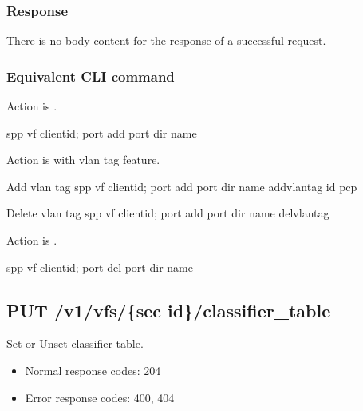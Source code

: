 \documentclass[a4paper,11pt,openany,oneside,english]{sphinxmanual}
\begin{document}
\subsubsection{Response}
\label{\detokenize{api_ref/spp_vf:id12}}
There is no body content for the response of a successful  request.


\subsubsection{Equivalent CLI command}
\label{\detokenize{api_ref/spp_vf:id13}}
Action is .

\begin{sphinxVerbatim}[commandchars=\\\{\},formatcom=\footnotesize]
spp \PYGZgt{} vf \PYGZob{}client\PYGZus{}id\PYGZcb{}; port add \PYGZob{}port\PYGZcb{} \PYGZob{}dir\PYGZcb{} \PYGZob{}name\PYGZcb{}
\end{sphinxVerbatim}

Action is  with vlan tag feature.

\begin{sphinxVerbatim}[commandchars=\\\{\},formatcom=\footnotesize]
\PYGZsh{} Add vlan tag
spp \PYGZgt{} vf \PYGZob{}client\PYGZus{}id\PYGZcb{}; port add \PYGZob{}port\PYGZcb{} \PYGZob{}dir\PYGZcb{} \PYGZob{}name\PYGZcb{} add\PYGZus{}vlantag \PYGZob{}id\PYGZcb{} \PYGZob{}pcp\PYGZcb{}

\PYGZsh{} Delete vlan tag
spp \PYGZgt{} vf \PYGZob{}client\PYGZus{}id\PYGZcb{}; port add \PYGZob{}port\PYGZcb{} \PYGZob{}dir\PYGZcb{} \PYGZob{}name\PYGZcb{} del\PYGZus{}vlantag
\end{sphinxVerbatim}

Action is .

\begin{sphinxVerbatim}[commandchars=\\\{\},formatcom=\footnotesize]
spp \PYGZgt{} vf \PYGZob{}client\PYGZus{}id\PYGZcb{}; port del \PYGZob{}port\PYGZcb{} \PYGZob{}dir\PYGZcb{} \PYGZob{}name\PYGZcb{}
\end{sphinxVerbatim}


\subsection{PUT /v1/vfs/\{sec id\}/classifier\_table}
\label{\detokenize{api_ref/spp_vf:put-v1-vfs-sec-id-classifier-table}}
Set or Unset classifier table.
\begin{itemize}
\item {} 
Normal response codes: 204

\item {} 
Error response codes: 400, 404

\end{itemize}
\end{document}
